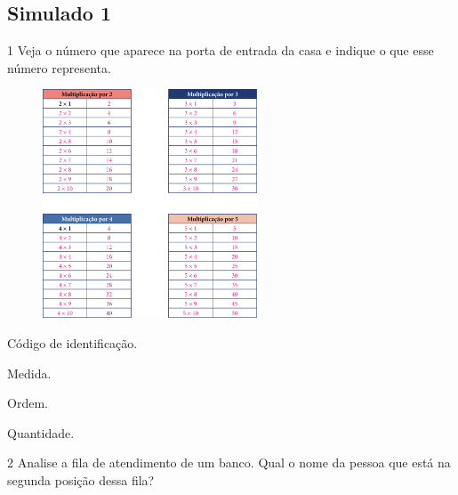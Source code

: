 \begin{escolha}
\begin{escolha}
\chapter{Simulado 1}

\num{1} Veja o número que aparece na porta de entrada da casa e indique o que
esse número representa.

\includegraphics[width=3.34635in,height=2.67708in]{media/image105.png}


\begin{minipage}{.5\textwidth}
\begin{escolha}
\item Código de identificação.

\item Medida.

\item Ordem.

\item Quantidade.
\end{escolha}
\end{minipage}

\num{2} Analise a fila de atendimento de um banco. Qual o nome da pessoa que
está na segunda posição dessa fila?


\end{escolha}
\end{escolha}
